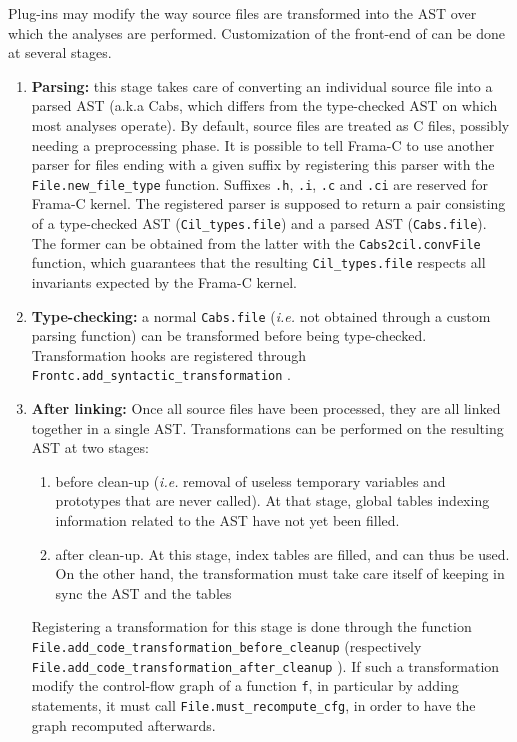 Plug-ins may modify the way source files are transformed into the AST
over which the analyses are performed. Customization of the front-end of
\framac can be done at several stages.

\begin{enumerate}[A --]
\item\textbf{Parsing:} this stage takes care of converting an individual source
file into a parsed AST (a.k.a Cabs, which differs from the type-checked AST on
which most analyses operate). By default, source files are treated as C files,
possibly needing a preprocessing phase. It is possible to tell Frama-C to use
another parser for files ending with a given suffix by registering this
parser with the \texttt{File.new\_file\_type}
function. Suffixes \texttt{.h}, \texttt{.i}, \texttt{.c} and \texttt{.ci}
are reserved for
Frama-C kernel. The registered parser is supposed to return a pair consisting
of a type-checked AST (\verb+Cil_types.file+) and
a parsed AST (\verb+Cabs.file+). The former can be obtained
from the latter with the \verb+Cabs2cil.convFile+
function, which guarantees that the resulting \verb+Cil_types.file+ respects
all invariants expected by the Frama-C kernel.
\item\textbf{Type-checking:} a normal \verb+Cabs.file+ ({\it i.e.} not obtained
through a custom parsing function) can be transformed before being
type-checked. Transformation hooks are registered through
\verb+Frontc.add_syntactic_transformation+%
.
\item\textbf{After linking:} Once all source files have been processed, they
  are all linked together in a single AST. Transformations can be performed
  on the resulting AST at two stages:
  \begin{enumerate}[1.]
  \item before clean-up ({\it i.e.} removal of useless temporary variables
    and prototypes that are never called). At that stage, global tables indexing
    information related to the AST have not yet been filled.
  \item after clean-up. At this stage, index tables are filled, and can thus
    be used. On the other hand, the transformation must take care itself
    of keeping in sync the AST and the tables
  \end{enumerate}
  Registering a transformation for this stage is done through the function
  \verb+File.add_code_transformation_before_cleanup+%
  (respectively \verb+File.add_code_transformation_after_cleanup+%
  ). If such a
  transformation modify the control-flow graph of a function \texttt{f}, in
  particular by adding statements, it must call
  \verb|File.must_recompute_cfg|, in
  order to have the graph recomputed afterwards.
\end{enumerate}

